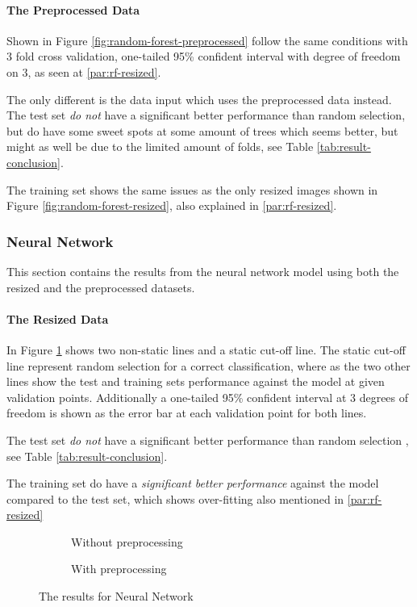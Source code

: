 \paragraph{The Preprocessed Data}
Shown in Figure \ref{fig:random-forest-preprocessed} follow the same conditions with 3 fold cross validation, one-tailed 95\% confident interval with degree of freedom on 3, as seen at \ref{par:rf-resized}.

The only different is the data input which uses the preprocessed data instead.
The test set \emph{do not} have a significant better performance than random selection, but do have some sweet spots at some amount of trees which seems better, but might as well be due to the limited amount of folds, see Table \ref{tab:result-conclusion}.

The training set shows the same issues as the only resized images shown in Figure \ref{fig:random-forest-resized}, also explained in \ref{par:rf-resized}.

\subsubsection{Neural Network}
\label{subsubsec:neuralnetwork}
This section contains the results from the neural network model using both the resized and the preprocessed datasets.

\paragraph{The Resized Data}
In Figure \ref{fig:nn-resized} shows two non-static lines and a static cut-off line.
The static cut-off line represent random selection for a correct classification, where as the two other lines show the test and training sets performance against the model at given validation points. Additionally a one-tailed 95\% confident interval at 3 degrees of freedom is shown as the error bar at each validation point for both lines.

The test set \emph{do not} have a significant better performance than random selection
, see Table \ref{tab:result-conclusion}.

The training set do have a \emph{significant better performance} against the model compared to the test set, which shows over-fitting also mentioned in \ref{par:rf-resized}


\begin{figure*}
  \centering
    \begin{subfigure}{.5\linewidth}
      \centering
      \caption{Without preprocessing}
      \label{fig:nn-resized}
    \end{subfigure}%
    \begin{subfigure}{.5\linewidth}
      \centering
      \caption{With preprocessing}
      \label{fig:nn-preprocessed}
    \end{subfigure}
  \caption{The results for Neural Network}
  \label{fig:neural-network}
\end{figure*}

